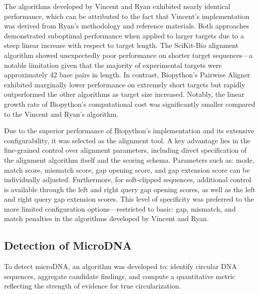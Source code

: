 \documentclass[11pt, letterpaper]{article}
\begin{document}
The algorithms developed by Vincent and Ryan exhibited nearly identical performance, which can be attributed to the fact that Vincent's implementation was derived from Ryan's methodology and reference materials. Both approaches demonstrated suboptimal performance when applied to larger targets due to a steep linear increase with respect to target length. The SciKit-Bio alignment algorithm showed unexpectedly poor performance on shorter target sequences—a notable limitation given that the majority of experimental targets were approximately 42 base pairs in length. In contrast, Biopython’s Pairwise Aligner exhibited marginally lower performance on extremely short targets but rapidly outperformed the other algorithms as target size increased. Notably, the linear growth rate of Biopython’s computational cost was significantly smaller compared to the Vincent and Ryan's algorithm.

Due to the superior performance of Biopython's implementation and its extensive configurability, it was selected as the alignment tool. A key advantage lies in the fine-grained control over alignment parameters, including direct specification of the alignment algorithm itself and the scoring schema. Parameters such as: mode, match score, mismatch score, gap opening score, and gap extension score can be individually adjusted. Furthermore, for soft-clipped sequences, additional control is available through the left and right query gap opening scores, as well as the left and right query gap extension scores. This level of specificity was preferred to the more limited configuration options—restricted to basic: gap, mismatch, and match penalties in the algorithms developed by Vincent and Ryan.

\subsection{Detection of MicroDNA}
To detect microDNA, an algorithm was developed to: identify circular DNA sequences, aggregate candidate findings, and compute a quantitative metric reflecting the strength of evidence for true circularization.
\end{document}
